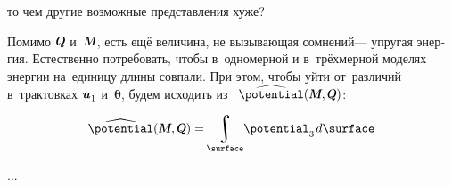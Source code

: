 \begin{otherlanguage}{russian}
\vspace{-0.2em}\noindent
то чем другие возможные представления хуже?

Помимо $\mathboldQ$ и~$\mathboldM$, есть ещё величина, не вызывающая сомнений\:--- упругая энергия.
Естественно потребовать, чтобы в~одно\-мерной и в~трёх\-мерной моделях энергии на~единицу длины совпали.
При этом, чтобы уйти от~различий в~трактовках ${\bm{u}_{\raisemath{-0.2ex}{1}}}$ и~$\bm{\theta}$, будем исходить из ~${\widehat{\potential}(\mathboldM, \mathboldQ)}$:

\nopagebreak\vspace{-0.1em}\begin{equation*}
\widehat{\potential}(\mathboldM, \mathboldQ) = \hspace{-0.2ex} \integral\displaylimits_{\surface} \hspace{-0.4ex} \potential_{\raisemath{-0.2ex}{3}} \hspace{.2ex} d\surface
\end{equation*}

...



\end{otherlanguage}



\label{para:variationalmethodforonedimension}

